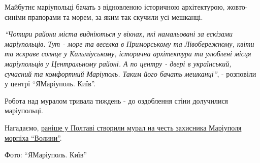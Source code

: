 Майбутнє маріупольці бачать з відновленою історичною архітектурою, жовто-синіми
прапорами та морем, за яким так скучили усі мешканці.


\emph{\enquote{Чотири райони міста видніються у вікнах, які намальовані за ескізами
маріупольців. Тут - море та веселка в Приморському та Лівобережному, квіти та
яскраве солнце у Кальміуському, історична архітектура та улюблені місця
маріупольців у Центральному районі. А по центру - двері в український, сучасний
та комфортний Маріуполь. Таким його бачать мешканці}}, - розповіли у центрі
\enquote{ЯМаріуполь. Київ}.

Робота над муралом тривала тиждень - до оздоблення стіни долучилися
маріупольці.

Нагадаємо,
\href{https://mrpl.city/news/view/u-poltavi-stvoryuyut-mural-na-chest-zahisnika-mariupolya-morpiha-volini}{раніше
у Полтаві створили мурал на честь захисника Маріуполя морпіха
\enquote{Волини}}.

Фото: \enquote{ЯМаріуполь. Київ}

